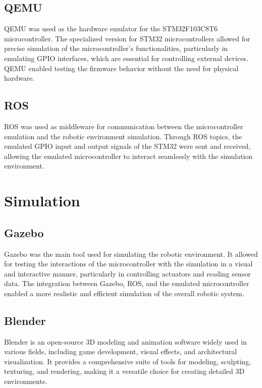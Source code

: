 \documentclass[../../monografia.tex]{subfiles}
\begin{document}
\subsection{QEMU}
QEMU \cite{QEMU_website_24} was used as the hardware emulator for the STM32F103C8T6 microcontroller. The specialized version for STM32 microcontrollers allowed for precise simulation of the microcontroller’s functionalities, particularly in emulating GPIO interfaces, which are essential for controlling external devices. QEMU enabled testing the firmware behavior without the need for physical hardware.

\subsection{ROS}

ROS \cite{ROS_website_24} was used as middleware for communication between the microcontroller emulation and the robotic environment simulation. Through ROS topics, the emulated GPIO input and output signals of the STM32 were sent and received, allowing the emulated microcontroller to interact seamlessly with the simulation environment.


\section{Simulation}
\subsection{Gazebo}

Gazebo was the main tool used for simulating the robotic environment. It allowed for testing the interactions of the microcontroller with the simulation in a visual and interactive manner, particularly in controlling actuators and reading sensor data. The integration between Gazebo, ROS, and the emulated microcontroller enabled a more realistic and efficient simulation of the overall robotic system.
\subsection{Blender}

Blender is an open-source 3D modeling and animation software widely used in various fields, including game development, visual effects, and architectural visualization. It provides a comprehensive suite of tools for modeling, sculpting, texturing, and rendering, making it a versatile choice for creating detailed 3D environments.
\end{document}
